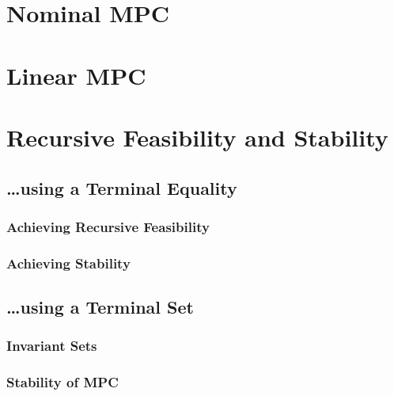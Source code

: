     \section{Nominal MPC} %

    \section{Linear MPC} %

    \section{Recursive Feasibility and Stability} %

        \subsection{\dots using a Terminal Equality} %

            \subsubsection{Achieving Recursive Feasibility} %

            \subsubsection{Achieving Stability} %

        \subsection{\dots using a Terminal Set} %

            \subsubsection{Invariant Sets} %

            \subsubsection{Stability of MPC} %

